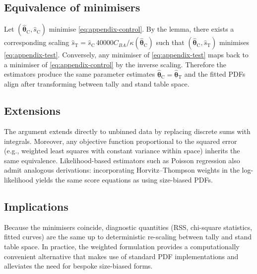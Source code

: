 \subsection{Equivalence of minimisers}

Let $(\hat{\boldsymbol{\theta}}_{\mathrm{C}}, \hat{s}_{\mathrm{C}})$ minimise
\eqref{eq:appendix-control}. By the lemma, there exists a corresponding scaling
$\hat{s}_{\mathrm{T}} = \hat{s}_{\mathrm{C}}\, 40000 C_{BA}/\kappa(\hat{\boldsymbol{\theta}}_{\mathrm{C}})$
such that $(\hat{\boldsymbol{\theta}}_{\mathrm{C}}, \hat{s}_{\mathrm{T}})$ minimises
\eqref{eq:appendix-test}. Conversely, any minimiser of
\eqref{eq:appendix-test} maps back to a minimiser of \eqref{eq:appendix-control}
by the inverse scaling. Therefore the estimators produce the same parameter
estimates $\hat{\boldsymbol{\theta}}_{\mathrm{C}} = \hat{\boldsymbol{\theta}}_{\mathrm{T}}$ and
the fitted PDFs align after transforming between tally and stand table space.

\subsection{Extensions}

The argument extends directly to unbinned data by replacing discrete sums with
integrals. Moreover, any objective function proportional to the squared error
(e.g., weighted least squares with constant variance within space) inherits the
same equivalence. Likelihood-based estimators such as Poisson regression also
admit analogous derivations: incorporating Horvitz--Thompson weights in the log-
likelihood yields the same score equations as using size-biased PDFs.

\subsection{Implications}

Because the minimisers coincide, diagnostic quantities (RSS, chi-square
statistics, fitted curves) are the same up to deterministic re-scaling between
tally and stand table space. In practice, the weighted formulation provides a
computationally convenient alternative that makes use of standard PDF
implementations and alleviates the need for bespoke size-biased forms.
